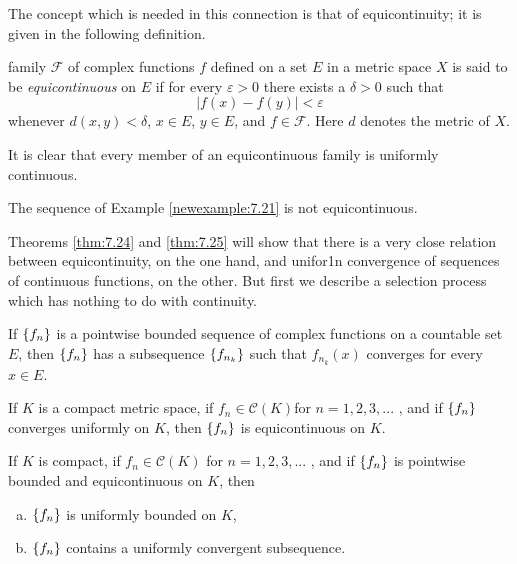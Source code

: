 The concept which is needed in this connection is that of equicontinuity;
it is given in the following definition.

\begin{mydef}
    \label{mydef:7.22}
    family $\mathscr{F}$ of complex functions $f$ defined on a set $E$ in a
    metric space $X$ is said to be \emph{equicontinuous} on $E$ 
    if for every $\varepsilon > 0$ there exists a $\delta > 0$ such that
    \begin{equation*}
        \left| f(x) - f(y) \right| < \varepsilon
    \end{equation*}
    whenever $d(x, y) < \delta$, $x \in E$, $y \in E$, and $f \in \mathscr{F}$. Here $d$ denotes the metric of $X$.

    It is clear that every member of an equicontinuous family is uniformly
    continuous.
\end{mydef}

The sequence of Example \ref{newexample:7.21} is not equicontinuous.

Theorems \ref{thm:7.24} and \ref{thm:7.25} will show that there is a very close relation between equicontinuity, on the one hand, 
and unifor1n convergence of sequences of continuous functions, on the other. 
But first we describe a selection process which has nothing to do with continuity.

\begin{thm}
    \label{thm:7.23}
    If $\protect\{f_n\}$ is a pointwise bounded sequence of complex functions on a countable set $E$, 
    then $\protect\{f_n\}$ has a subsequence $\protect\{f_{n_k}\}$ such that ${f_{n_k}(x)}$ converges for every $x \in E$.
\end{thm}


\begin{thm}
    \label{thm:7.24}
    If $K$ is a compact metric space, 
    if $f_n \in  \mathscr{C}(K)$for $n = 1, 2, 3, ...$ ,
    and if $\protect\{f_n\}$ converges uniformly on $K$, 
    then $\protect\{f_n\}$ is equicontinuous on $K$.
\end{thm}



\begin{thm}
    \label{thm:7.25}
    If $K$ is compact, 
    if $f_n \in \mathscr{C}(K)$ for $n = 1, 2, 3, ...$ , 
    and if $\protect\{f_n\}$ is pointwise bounded and equicontinuous on $K$, then
    \begin{enumerate}[(a)]
        \item $\protect\{f_n\}$ is uniformly bounded on $K$,
        \item $\protect\{f_n\}$ contains a uniformly convergent subsequence.
    \end{enumerate}
\end{thm}



